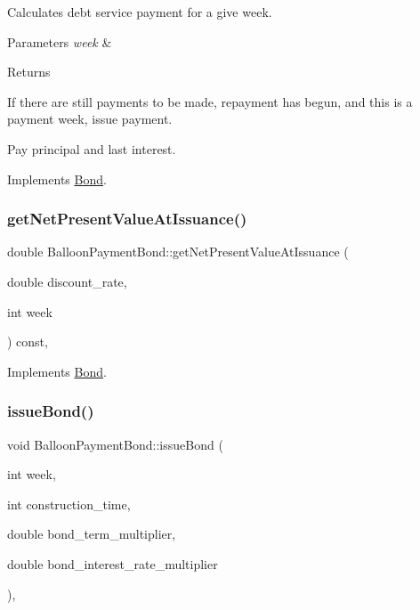 Calculates debt service payment for a give week. 
\begin{DoxyParams}{Parameters}
{\em week} & \\
\hline
\end{DoxyParams}
\begin{DoxyReturn}{Returns}

\end{DoxyReturn}
If there are still payments to be made, repayment has begun, and this is a payment week, issue payment.

Pay principal and last interest. 

Implements \mbox{\hyperlink{classBond_a98d8ecaf4b36319674ebd220598996bc}{Bond}}.

\mbox{\label{classBalloonPaymentBond_a11e5aecaf542cfbbb2303e98fb0b93bf}} 
\subsubsection{\texorpdfstring{get\+Net\+Present\+Value\+At\+Issuance()}{getNetPresentValueAtIssuance()}}
{\footnotesize\ttfamily double Balloon\+Payment\+Bond\+::get\+Net\+Present\+Value\+At\+Issuance (\begin{DoxyParamCaption}\item[{double}]{discount\+\_\+rate,  }\item[{int}]{week }\end{DoxyParamCaption}) const\hspace{0.3cm}{\ttfamily [override]}, {\ttfamily [virtual]}}



Implements \mbox{\hyperlink{classBond_a5997278813deb16aa5d01bbca8ecc7b2}{Bond}}.

\mbox{\label{classBalloonPaymentBond_af22552acd74b08dbb1d308cc5e45344c}} 
\subsubsection{\texorpdfstring{issue\+Bond()}{issueBond()}}
{\footnotesize\ttfamily void Balloon\+Payment\+Bond\+::issue\+Bond (\begin{DoxyParamCaption}\item[{int}]{week,  }\item[{int}]{construction\+\_\+time,  }\item[{double}]{bond\+\_\+term\+\_\+multiplier,  }\item[{double}]{bond\+\_\+interest\+\_\+rate\+\_\+multiplier }\end{DoxyParamCaption})\hspace{0.3cm}{\ttfamily [override]}, {\ttfamily [virtual]}}

